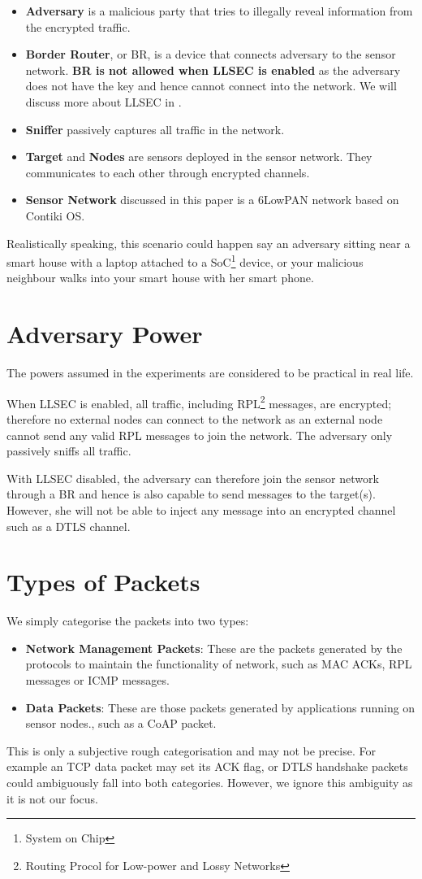 \begin{itemize}
\item{\bf Adversary} is a malicious party that tries to illegally reveal information from the encrypted traffic.
\item{\bf Border Router}, or BR, is a device that connects adversary to the sensor network. \textbf{BR is not allowed when LLSEC is enabled} as the adversary does not have the key and hence cannot connect into the network. We will discuss more about LLSEC in .
\item{\bf Sniffer} passively captures all traffic in the network. 
\item{\bf Target} and {\bf Nodes} are sensors deployed in the sensor network. They communicates to each other through encrypted channels.
\item{\bf Sensor Network} discussed in this paper is a 6LowPAN network based on Contiki OS.
\end{itemize}

Realistically speaking, this scenario could happen say an adversary sitting near a smart house with a laptop attached to a SoC\footnote{System on Chip} device, or your malicious neighbour walks into your smart house with her smart phone.

\section{Adversary Power}
The powers assumed in the experiments are considered to be practical in real life.

When LLSEC is enabled, all traffic, including RPL\footnote{Routing Procol for Low-power and Lossy Networks} messages, are encrypted; therefore no external nodes can connect to the network as an external node cannot send any valid RPL messages to join the network. The adversary only passively sniffs all traffic.

With LLSEC disabled, the adversary can therefore join the sensor network through a BR and hence is also capable to send messages to the target(s). However, she will not be able to inject any message into an encrypted channel such as a DTLS channel.

\section{Types of Packets}
We simply categorise the packets into two types:
\begin{itemize}
\item {\bf Network Management Packets}: These are the packets generated by the protocols to  maintain the functionality of network, such as MAC ACKs, RPL messages or ICMP messages.
\item {\bf Data Packets}: These are those packets generated by applications running on sensor nodes., such as a CoAP packet.
\end{itemize}

This is only a subjective rough categorisation and may not be precise. For example an TCP data packet may set its ACK flag, or DTLS handshake packets could ambiguously fall into both categories. However, we ignore this ambiguity as it is not our focus.